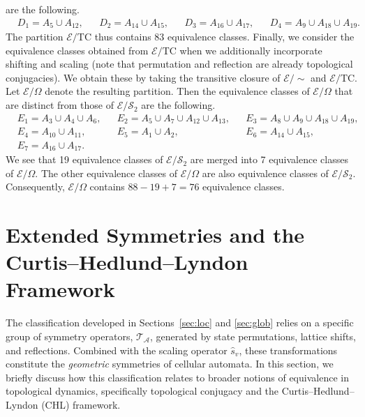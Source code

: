 \documentclass[a4paper]{article}
\begin{document}
are the following.
\begin{align*}
& D_1 = A_5 \cup A_{12}, & & D_2 = A_{14} \cup A_{15}, & & D_3 = A_{16} \cup A_{17},
& & D_4 = A_{9} \cup A_{18} \cup A_{19}.
\end{align*}
The partition $\mathcal{E}/\mathrm{TC}$ thus contains 83 equivalence classes.
Finally, we consider the equivalence classes obtained from $\mathcal{E} / \mathrm{TC}$
when we additionally incorporate shifting and scaling (note that permutation and reflection are already topological conjugacies).
We obtain these by taking the transitive closure of $\mathcal{E} / {\sim}$ and $\mathcal{E} / \mathrm{TC}$.
Let $\mathcal{E} / \Omega$ denote the resulting partition.
Then the equivalence classes of $\mathcal{E}/ \Omega$ that are distinct from those of
$\mathcal{E} / \mathcal{S}_2$ are the following.
\begin{align*}
& E_1 = A_3 \cup A_4 \cup A_6, & & E_2=A_5 \cup A_7 \cup A_{12} \cup A_{13}, & & E_3=A_8 \cup A_9 \cup A_{18} \cup A_{19}, \\
& E_4 = A_{10} \cup A_{11}, & & E_5 = A_1 \cup A_2, & & E_6 = A_{14} \cup A_{15}, \\
& E_7 = A_{16} \cup A_{17}. & & & &
\end{align*}
We see that 19 equivalence classes of $\mathcal{E} / \mathcal{S}_2$ are merged into
7 equivalence classes of $\mathcal{E} / \Omega$.
The other equivalence classes of $\mathcal{E} / \Omega$ are also equivalence classes of $\mathcal{E} / \mathcal{S}_2$.
Consequently, $\mathcal{E} / \Omega$ contains $88 - 19 + 7 = 76$ equivalence classes.

\section{Extended Symmetries and the Curtis--Hedlund--Lyndon Framework}
\label{sec:extended}

The classification developed in Sections~\ref{sec:loc} and \ref{sec:glob} relies on a specific group of symmetry operators, $\mathcal{T}_{\mathcal{A}}$, generated by state permutations, lattice shifts, and reflections. Combined with the scaling operator $\hat{s}_v$, these transformations constitute the \emph{geometric} symmetries of cellular automata. In this section, we briefly discuss how this classification relates to broader notions of equivalence in topological dynamics, specifically topological conjugacy and the Curtis--Hedlund--Lyndon (CHL) framework.
\end{document}

